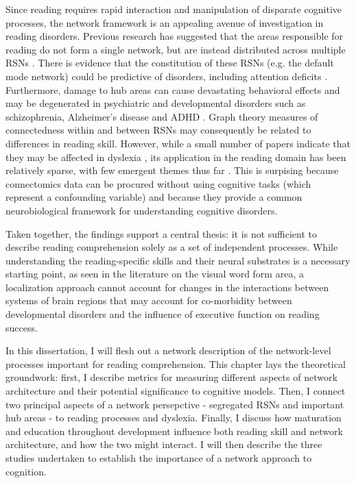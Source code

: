 Since reading requires rapid interaction and manipulation of disparate cognitive processes, the network framework is an appealing avenue of investigation in reading disorders. Previous research has suggested that the areas responsible for reading do not form a single network, but are instead distributed across multiple RSNs \cite{Vogel2013}. There is evidence that the constitution of these RSNs (e.g. the default mode network) could be predictive of disorders, including attention deficits \cite{Uddin2008}. Furthermore, damage to hub areas can cause devastating behavioral effects \cite{Warren2014} and may be degenerated in psychiatric and developmental disorders such as schizophrenia, Alzheimer's disease and ADHD \cite{Stam2014}. Graph theory measures of connectedness within and between RSNs may consequently be related to differences in reading skill. However, while a small number of papers indicate that they may be affected in dyslexia \cite{Qi2016, Finn2014}, its application in the reading domain has been relatively sparse, with few emergent themes thus far \cite{Cao2016}. This is surpising because connectomics data can be procured without using cognitive tasks (which represent a confounding variable) and because they provide a common neurobiological framework for understanding cognitive disorders.

Taken together, the findings support a central thesis: it is not sufficient to describe reading comprehension solely as a set of independent processes. While understanding the reading-specific skills and their neural substrates is a necessary starting point, as seen in the literature on the visual word form area, a localization approach cannot account for changes in the interactions between systems of brain regions that may account for co-morbidity between developmental disorders and the influence of executive function on reading success. 

In this dissertation, I will flesh out a network description of the network-level processes important for reading comprehension. This chapter lays the theoretical groundwork: first, I describe metrics for measuring different aspects of network architecture and their potential significance to cognitive models. Then, I connect two principal aspects of a network persepctive - segregated RSNs and important hub areas - to reading processes and dyslexia. Finally, I discuss how maturation and education throughout development influence both reading skill and network architecture, and how the two might interact. I will then describe the three studies undertaken to establish the importance of a network approach to cognition.


